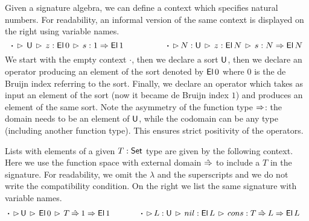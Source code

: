 \documentclass[a4paper,UKenglish,cleveref, autoref]{lipics-v2019}
\begin{document}
\begin{example}\label{ex:contexts}
  Given a signature algebra, we can define a context which
  specifies natural numbers. For readability, an informal version
  of the same context is displayed on the right using variable names.
  \[
    \boldsymbol{\cdot}\,\rhd\,\mathsf{U}\,\rhd\,z : \mathsf{El}\,0\,\rhd\,s : 1 \Rightarrow \mathsf{El}\,1
    \hspace{4.9em}
    \boldsymbol{\cdot}\,\rhd\,N:\mathsf{U}\,\rhd\,z : \mathsf{El}\,N\,\rhd\,s : N \Rightarrow \mathsf{El}\,N
  \]
  We start with the empty context $\boldsymbol{\cdot}$, then we
  declare a sort $\mathsf{U}$, then we declare an operator producing an
  element of the sort denoted by $\mathsf{El}\,0$ where $0$ is the de Bruijn
  index referring to the sort. Finally, we declare an operator which
  takes as input an element of the sort (now it became de Bruijn index
  $1$) and produces an element of the same sort. Note the asymmetry of
  the function type $\Rightarrow$: the domain needs to be an element of
  $\mathsf{U}$, while the codomain can be any type (including another
  function type). This ensures strict positivity of the operators.

  Lists with elements of a given $T : \mathsf{Set}$ type are given by the
  following context. Here we use the function space with external
  domain $\mathbin{\hat{\Rightarrow}}$ to include a $T$ in the signature. For readability, we
  omit the $\lambda$ and the superscripts and we do not write the
  compatibility condition. On the right we list the same signature
  with variable names.
  \begin{alignat*}{10}
    & \boldsymbol{\cdot}\,\ext\,\U\,\ext\,\El\,0\,\ext\,T\Ram 1\Ra \El\,1 \hspace{3.56em} \boldsymbol{\cdot}\,\ext\,L:\U\,\ext\,nil : \El\,L\,\ext\,cons : T\Ram L\Ra \El\,L
  \end{alignat*}


\end{example}
\end{document}
